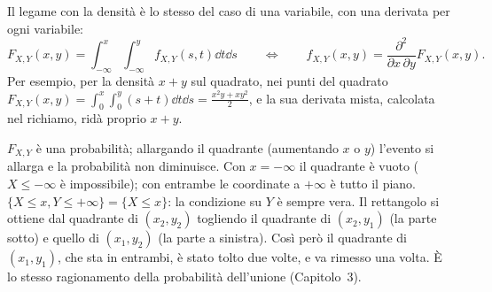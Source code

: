 Il legame con la densità è lo stesso del caso di una variabile, con una derivata per ogni variabile:
\[ F_{X,Y}(x, y) = \int_{-\infty}^{x} \int_{-\infty}^{y} f_{X,Y}(s, t) \dd t \dd s \qquad\Longleftrightarrow\qquad
   f_{X,Y}(x, y) = \frac{\partial^2}{\partial x\, \partial y} F_{X,Y}(x, y) . \]
Per esempio, per la densità $x + y$ sul quadrato, nei punti del quadrato
$F_{X,Y}(x, y) = \int_0^x \int_0^y (s + t) \dd t \dd s = \frac{x^2 y + x y^2}{2}$, e la sua derivata mista, calcolata nel
richiamo, ridà proprio $x + y$.


\begin{dimostrazione}
 $F_{X,Y}$ è una probabilità; allargando il quadrante (aumentando $x$ o $y$) l'evento si allarga e la
probabilità non diminuisce. Con $x = -\infty$ il quadrante è vuoto ($X \leq -\infty$ è impossibile); con entrambe le
coordinate a $+\infty$ è tutto il piano.
 $\{X \leq x, Y \leq +\infty\} = \{X \leq x\}$: la condizione su $Y$ è sempre vera.
 Il rettangolo si ottiene dal quadrante di $(x_2, y_2)$ togliendo il quadrante di
$(x_2, y_1)$ (la parte sotto) e quello di $(x_1, y_2)$ (la parte a sinistra). Così però il quadrante di $(x_1, y_1)$,
che sta in entrambi, è stato tolto due volte, e va rimesso una volta. È lo stesso ragionamento della probabilità
dell'unione (Capitolo~3).
\end{dimostrazione}

